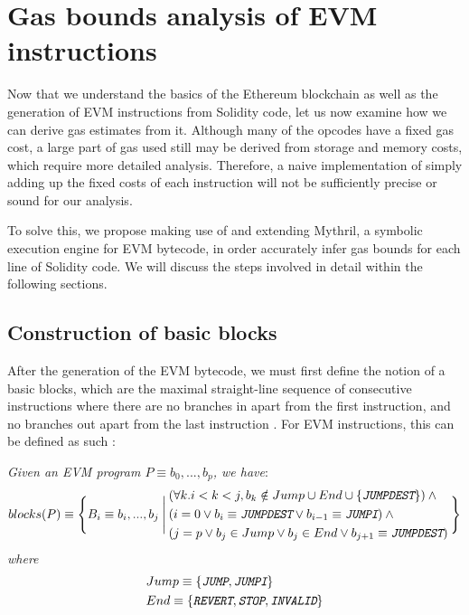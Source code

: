 \chapter{Gas bounds analysis of EVM instructions}

Now that we understand the basics of the Ethereum blockchain as well as 
the generation of EVM instructions from Solidity code, let us now examine
how we can derive gas estimates from it. Although many 
of the opcodes have a fixed gas cost, a large part of gas used still may be derived from 
storage and memory costs, which require more detailed analysis. Therefore, a
naive implementation of simply adding up the fixed costs of each instruction
will not be sufficiently precise or sound for our analysis.

To solve this, we propose making use of and extending Mythril, a symbolic execution engine for EVM bytecode,
in order accurately infer gas bounds for each line of Solidity code. We will discuss the steps involved in detail within
the following sections.

\section{Construction of basic blocks}

After the generation of the EVM bytecode, we must first define the notion of a basic blocks, 
which are the maximal straight-line sequence of consecutive instructions where there are no branches
in apart from the first instruction, and no branches out apart from the last instruction 
\cite{HennessyPatterson12}. For EVM instructions, this can be defined as such \cite{constructcfg}:

\begin{definition}

  \textit{Given an EVM program $P \equiv b_0,...,b_p$, we have}:
  \[
    blocks(P) \equiv \Bigg\{ B_i \equiv b_i,...,b_j \:\Bigg|\:
    \begin{aligned}
      & (\forall k.i < k < j, b_k \notin Jump \cup End \cup \{ \textit{\texttt{JUMPDEST}} \}) \: \land  \\
      & (i = 0 \lor b_i \equiv \textit{\texttt{JUMPDEST}} \lor b_{i-1} \equiv \textit{\texttt{JUMPI}}) \: \land \\
      & (j = p \lor b_j \in Jump \lor b_j \in End \lor b_{j+1} \equiv \textit{\texttt{JUMPDEST}})
    \end{aligned}
    \:
    \Bigg\}
  \]
  \textit{where}
  \[
    \begin{aligned}
    &Jump \equiv \{ \textit{\texttt{JUMP}}, \textit{\texttt{JUMPI}} \} \\
    &End \equiv \{ \textit{\texttt{REVERT}}, \textit{\texttt{STOP}}, \textit{\texttt{INVALID}} \}
    \end{aligned}
  \]

\end{definition}

